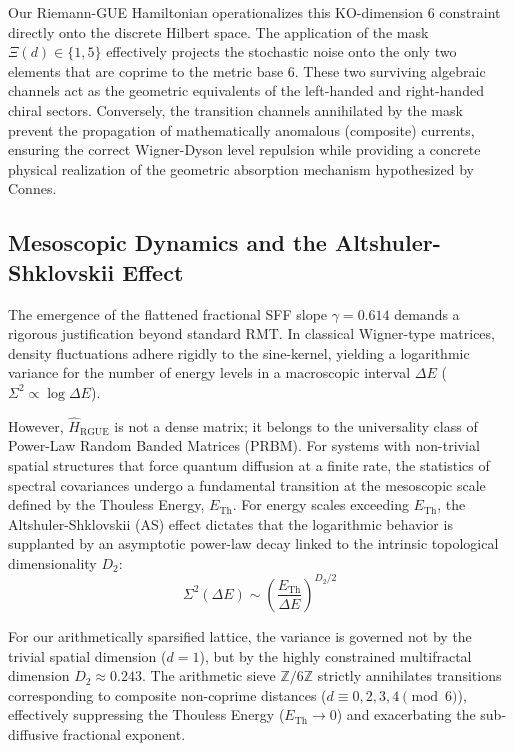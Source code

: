 \documentclass[aps,prl,preprint,superscriptaddress,floatfix]{revtex4-2}
\newcommand{\Zmod}{\mathbb{Z}/6\mathbb{Z}}
\begin{document}
Our Riemann-GUE Hamiltonian operationalizes this KO-dimension 6 constraint directly onto the discrete Hilbert space. The application of the mask $\Xi(d) \in \{1,5\}$ effectively projects the stochastic noise onto the only two elements that are coprime to the metric base 6. These two surviving algebraic channels act as the geometric equivalents of the left-handed and right-handed chiral sectors. Conversely, the transition channels annihilated by the mask prevent the propagation of mathematically anomalous (composite) currents, ensuring the correct Wigner-Dyson level repulsion while providing a concrete physical realization of the geometric absorption mechanism hypothesized by Connes.

\subsection{Mesoscopic Dynamics and the Altshuler-Shklovskii Effect}

The emergence of the flattened fractional SFF slope $\gamma = 0.614$ demands a rigorous justification beyond standard RMT. In classical Wigner-type matrices, density fluctuations adhere rigidly to the sine-kernel, yielding a logarithmic variance for the number of energy levels in a macroscopic interval $\Delta E$ ($\Sigma^2 \propto \log \Delta E$).

However, $\hat{H}_{\text{RGUE}}$ is not a dense matrix; it belongs to the universality class of Power-Law Random Banded Matrices (PRBM). For systems with non-trivial spatial structures that force quantum diffusion at a finite rate, the statistics of spectral covariances undergo a fundamental transition at the mesoscopic scale defined by the Thouless Energy, $E_{\text{Th}}$. For energy scales exceeding $E_{\text{Th}}$, the Altshuler-Shklovskii (AS) effect dictates that the logarithmic behavior is supplanted by an asymptotic power-law decay linked to the intrinsic topological dimensionality $D_2$:
\begin{equation}
\Sigma^2(\Delta E) \sim \left( \frac{E_{\text{Th}}}{\Delta E} \right)^{D_2/2}
\end{equation}

For our arithmetically sparsified lattice, the variance is governed not by the trivial spatial dimension ($d=1$), but by the highly constrained multifractal dimension $D_2 \approx 0.243$. The arithmetic sieve $\Zmod$ strictly annihilates transitions corresponding to composite non-coprime distances ($d \equiv 0,2,3,4 \pmod 6$), effectively suppressing the Thouless Energy ($E_{\text{Th}} \to 0$) and exacerbating the sub-diffusive fractional exponent.
\end{document}
